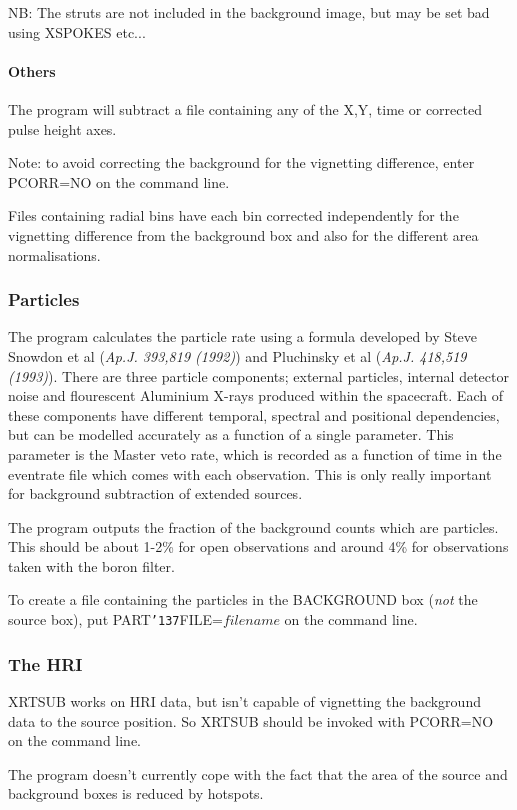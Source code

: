 \documentclass{book}
\renewcommand{\_}{{\tt\char'137}}     %
\begin{document}
NB: The struts are not included in the background image, but may be
set bad using XSPOKES etc...

\paragraph{Others}
The program will subtract a file containing any of the X,Y, time
or corrected pulse height axes.

Note: to avoid correcting the background for the vignetting difference,
enter PCORR=NO on the command line.

Files containing radial bins have each bin corrected independently
for the vignetting difference from the background box and also for
the different area normalisations.

\subsubsection{Particles}
The program calculates the particle rate using a formula developed
by Steve Snowdon et al ({\em Ap.J. 393,819 (1992)}) and Pluchinsky et al
({\em Ap.J. 418,519 (1993)}). There are three particle components;
external particles, internal detector noise and flourescent Aluminium
X-rays produced within the spacecraft. Each of these components have
different temporal, spectral and positional dependencies, but can be
modelled accurately as a function of a single parameter. This parameter
is the Master veto rate, which is recorded as a function of time in the
eventrate file which comes with each observation. This is only
really important for background subtraction of extended sources.

The program outputs the fraction of the background counts which are
particles. This should be about 1-2\% for open observations and
around 4\% for observations taken with the boron filter.

To create a file containing the particles in the BACKGROUND box
({\em not} the source box), put PART\_FILE=$filename$ on
the command line.

\subsubsection{The HRI}
XRTSUB works on HRI data, but isn't capable of vignetting the
background data to the source position. So XRTSUB should be
invoked with PCORR=NO on the command line.

The program doesn't currently cope with the fact that the area of the
source and background boxes is reduced by hotspots.
\end{document}
